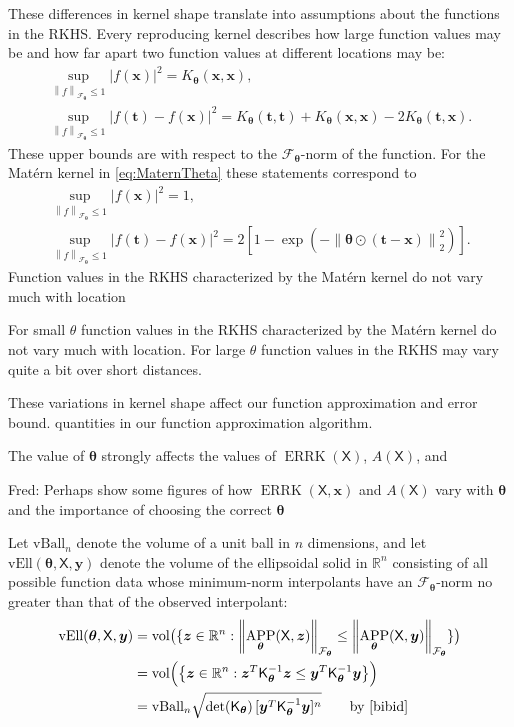 \documentclass[]{mcom-l}
\theoremstyle{theorem}
\theoremstyle{remark}
\newcommand{\vBall}{\text{vBall}_n}
\newcommand{\vEll}{\text{vEll}}
\DeclareMathOperator{\vol}{vol}
\DeclareMathOperator{\errK}{ERRK}
\DeclareMathOperator{\APP}{APP}
\newcommand{\reals}{{\mathbb{R}}}
\newcommand{\mK}{\mathsf{K}}
\newcommand{\mX}{\mathsf{X}}
\newcommand{\bx}{{\boldsymbol{x}}}
\newcommand{\by}{{\boldsymbol{y}}}
\newcommand{\bt}{{\boldsymbol{t}}}
\newcommand{\bz}{{\boldsymbol{z}}}
\newcommand{\btheta}{{\boldsymbol{\theta}}}
\newcommand{\calf}{{\mathcal{F}}}
\def\abs#1{\ensuremath{\left \lvert #1 \right \rvert}}
\newcommand{\norm}[2][{}]{\ensuremath{\left \lVert #2 \right \rVert}_{#1}}
\newcommand{\FredNote}[1]{{\color{blue}Fred: #1}}
\begin{document}
These differences in kernel shape translate into assumptions about the functions in the RKHS.  Every reproducing kernel describes how large function values may be and how far apart two function values at different locations may be:
\begin{subequations} \label{eq:diff_f}
\begin{gather}
\sup_{\norm[\calf_{\btheta}]{f} \le 1} \abs{f(\bx)}^2 = K_\btheta(\bx,\bx), \\   
\sup_{\norm[\calf_{\btheta}]{f} \le 1} \abs{f(\bt) - f(\bx)}^2 = K_{\btheta}(\bt,\bt) +  K_{\btheta}(\bx,\bx) - 2 K_{\btheta}(\bt,\bx).
\end{gather}
\end{subequations}
These upper bounds are with respect to the $\calf_\btheta$-norm of the function.  For the Mat\'ern kernel in \eqref{eq:MaternTheta} these statements correspond to 
\begin{subequations} \label{eq:diff_f_Matern}
	\begin{gather}
\sup_{\norm[\calf_{\btheta}]{f} \le 1} \abs{f(\bx)}^2 = 1, \\ 
\sup_{\norm[\calf_{\btheta}]{f} \le 1} \abs{f(\bt) - f(\bx)}^2 = 2[1 -  \exp(-\norm[2]{\btheta \odot (\bt-\bx)}^2)].
\end{gather}
\end{subequations}
Function values in the RKHS characterized by the Mat\'ern kernel do not vary much with location 


For small $\theta$ function values in the RKHS characterized by the Mat\'ern kernel do not vary much with location. For large $\theta$ function values in the RKHS may vary quite a bit over short distances.

These variations in kernel shape affect our function approximation and error bound. quantities in our function approximation algorithm.


The value of $\btheta$ strongly affects the values of $\errK(\mX)$, $A(\mX)$, and 

\FredNote{Perhaps show some figures of how $\errK(\mX,\bx)$ and $A(\mX)$ vary with $\btheta$ and the importance of choosing the correct $\btheta$}

Let $\vBall$ denote the volume of a unit ball in $n$ dimensions, and let $\vEll(\btheta,\mX,\by)$ denote the volume of the ellipsoidal solid in $\reals^n$ consisting of all possible function data whose minimum-norm interpolants have an $\calf_{\btheta}$-norm no greater than that of the observed interpolant:
\begin{align*}
\vEll(\btheta,\mX,\by) &= \vol\bigl(\{ \bz \in \reals^n : \norm[\calf_{\btheta}]{\APP_{\btheta}(\mX,\bz)}  \le \norm[\calf_{\btheta}]{\APP_{\btheta}(\mX,\by)} \} \bigr) \\
& = \vol\Bigl( \bigl \{ \bz \in \reals^n : \bz^T \mK_\btheta^{-1} \bz \le \by^T \mK_\btheta^{-1} \by  \bigr \} \Bigr) \\
& = \vBall \sqrt{\det(\mK_{\btheta})  \, [\by^T \mK_\btheta^{-1} \by]^n } \qquad \text{by \cite{bibid}}
\end{align*}
\end{document}
